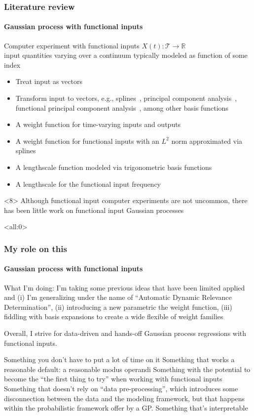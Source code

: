 \documentclass{snedecorbeamer}
\begin{document}
\begin{frame}
  \frametitle{Literature review}
  \framesubtitle{Gaussian process with functional inputs}

  Computer experiment with functional inputs $X(t):
  \mathcal{T}\to\mathbb{R}$ \\
  input quantities varying over a continuum typically modeled as function of
  some index

  \begin{itemize}[<+(1)->]
  \item Treat input as vectors~\citep{iooss2009}
  \item Transform input to vectors, e.g.,
    splines~\citep{betancourt2020,betancourt2020a}, principal component
    analysis~\citep{nanty2016}, functional principal component
    analysis~\citep{wang2017,wang2019}, among other basis
    functions~\citep{tan2019,li2021}
  \item A weight function for time-varying inputs and outputs~\citep{morris2012}
  \item A weight function for functional inputs with an $L^2$ norm approximated
    via splines \citep{muehlenstaedt2017}
  \item A lengthscale function modeled via trigonometric basis functions
    \citep{kuttubekova2019}
  \item A lengthscale for the functional input frequency \citep{chen2021}
  \end{itemize}

  \vfill{}
  \begin{exampleblock}{}<8>
    Although functional input computer experiments are not uncommon,
    there has been little work on functional input Gaussian processes
  \end{exampleblock}
\end{frame}

\begin{frame}<all:0>
  \frametitle{My role on this}
  \framesubtitle{Gaussian process with functional inputs}

  What I'm doing: I'm taking some previous ideas that have been limited applied
  and (i) I'm generalizing under the name of ``Automatic Dynamic Relevance
  Determination'', (ii) introducing a new parametric the weight function,
  (iii) fiddling with basis expansions to create a wide flexible of weight
  families

  Overall, I strive for data-driven and hands-off Gaussian process regressions
  with functional inputs.

  Something you don't have to put a lot of time on it
  Something that works a reasonable default: a reasonable modus operandi
  Something with the potential to become the ``the first thing to try'' when
  working with functional inputs
  Something that doesn't rely on ``data pre-processing'', which introduces some
disconnection between the data and the modeling framework, but that happens
within the probabilistic framework offer by a GP.
  Something that's interpretable
\end{frame}
\end{document}
